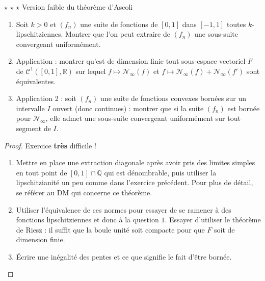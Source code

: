 \documentclass[french,a4paper]{article}
\newcommand{\Q}{\mathbb{Q}}
\newcommand{\R}{\mathbb{R}}
\theoremstyle{plain}
\theoremstyle{definition}
\theoremstyle{remark}
\begin{document}
\begin{ex}{$\star$ $\star$ $\star$ Version faible du théorème d'Ascoli}
	\begin{enumerate}
		\item Soit $k>0$ et $(f_n)$ une suite de fonctions de $[0,1]$ dans $[-1,1]$ toutes $k$-lipschitziennes. Montrer que l'on peut extraire de $(f_n)$ une sous-suite convergeant uniformément.
		\item Application : montrer qu'est de dimension finie tout sous-espace vectoriel $F$ de $\mathcal{C}^1([0,1],\R)$ sur lequel $f\mapsto\mathcal{N}_\infty(f)$ et $f\mapsto\mathcal{N}_\infty(f)+\mathcal{N}_\infty(f')$ sont équivalentes.
		\item Application 2 : soit $(f_n)$ une suite de fonctions convexes bornées sur un intervalle $I$ ouvert (donc continues) : montrer que si la suite $(f_n)$ est bornée pour $\mathcal{N}_\infty$, elle admet une sous-suite convergeant uniformément sur tout segment de $I$.
	\end{enumerate}
\end{ex}
\begin{proof}
	Exercice \textbf{très} difficile !
	\begin{enumerate}
		\item Mettre en place une extraction diagonale après avoir pris des limites simples en tout point de $[0,1]\cap \Q$ qui est dénombrable, puis utiliser la lipschitzianité un peu comme dans l'exercice précédent. Pour plus de détail, se référer au DM qui concerne ce théorème.
		\item Utiliser l'équivalence de ces normes pour essayer de se ramener à des fonctions lipschitziennes et donc à la question $1$. Essayer d'utiliser le théorème de Riesz : il suffit que la boule unité soit compacte pour que $F$ soit de dimension finie.
		\item Écrire une inégalité des pentes et ce que signifie le fait d'être bornée.
	\end{enumerate}
\end{proof}
\end{document}
